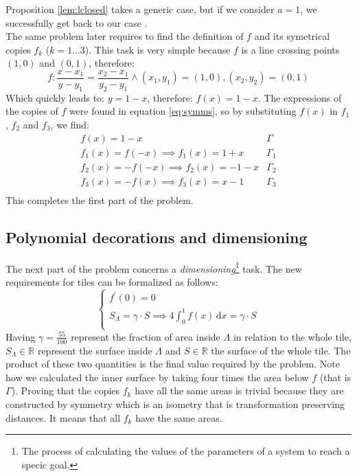 Proposition \ref{lem:lclosed} takes a generic case, but if we consider $a=1$, we
successfully get back to our case \cite{exam1}.\\

The same problem later requires to find the definition of $f$ and its symetrical
copies $f_k$ ($k = 1 \dots 3$). This task is very simple because $f$ is a line
crossing points $(1,0)$ and $(0,1)$, therefore:
\begin{equation*}
f: \frac{x-x_1}{y-y_1} = \frac{x_2-x_1}{y_2-y_1} \wedge (x_1,y_1) = (1,0), 
(x_2,y_2) = (0,1)
\end{equation*}
Which quickly leads to: $y = 1-x$, therefore: $f(x) = 1-x$. The expressions of the
copies of $f$ were found in equation \ref{eq:symms}, so by substituting $f(x)$
in $f_1$, $f_2$ and $f_3$, we find:
\begin{equation}\label{eq:exprs}
\begin{array}{l|c}
f(x) = 1 - x & \Gamma \\
f_1(x) = f(-x) \implies f_1(x) = 1 + x & \Gamma_1 \\
f_2(x) = -f(-x) \implies f_2(x) = - 1 - x & \Gamma_2 \\
f_3(x) = -f(x) \implies f_3(x) = x - 1 & \Gamma_3 \\
\end{array}
\end{equation}
This completes the first part of the problem.

\subsection{Polynomial decorations and dimensioning}
\label{sec:p1}

The next part of the problem concerns a \emph{dimensioning}\footnote{The
process of calculating the values of the parameters of a system
to reach a specic goal.} task.
The new requirements for tiles can be formalized as follows:
\begin{equation}
\label{eq:fconds2}
\begin{cases}
f^\prime(0) = 0\\
S_{\Lambda} = \gamma \cdot S \implies 
   4 \int^{1}_{0} f(x) \, \mathrm{d} x = \gamma \cdot S\\
\end{cases}
\end{equation}
Having $\gamma = \frac{55}{100}$ represent the fraction of area inside $\Lambda$
in relation to the whole tile, 
$S_{\Lambda} \in \mathbb{R}$ represent the surface 
inside $\Lambda$ and $S \in \mathbb{R}$ the
surface of the whole tile. The product of these two quantities is the final value 
required by the problem. Note how we calculated the inner surface by taking four
times the area below $f$ (that is $\Gamma$). Proving that the copies $f_k$
have all the 
same areas is trivial because they are constructed by symmetry which is 
an isometry that is transformation preserving distances. It means that 
all $f_k$ have the same areas. 

